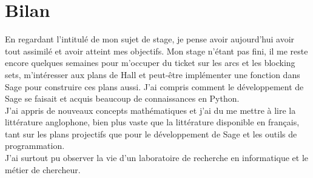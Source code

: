 \documentclass[a4paper]{article}
\begin{document}
\section*{Bilan}
En regardant l'intitulé de mon sujet de stage, je pense avoir aujourd'hui avoir tout assimilé et avoir atteint mes objectifs. Mon stage n'étant pas fini, il me reste encore quelques semaines pour m'occuper du ticket sur les arcs et les blocking sets, m'intéresser aux plans de Hall et peut-être implémenter une fonction dans Sage pour construire ces plans aussi. J'ai compris comment le développement de Sage se faisait et acquis beaucoup de connaissances en Python.\\
J'ai appris de nouveaux concepts mathématiques et j'ai du me mettre à lire la littérature anglophone, bien plus vaste que la littérature disponible en français, tant sur les plans projectifs que pour le développement de Sage et les outils de programmation.\\
J'ai surtout pu observer la vie d'un laboratoire de recherche en informatique et le métier de chercheur.
\newpage
\thispagestyle{empty}
\end{document}
